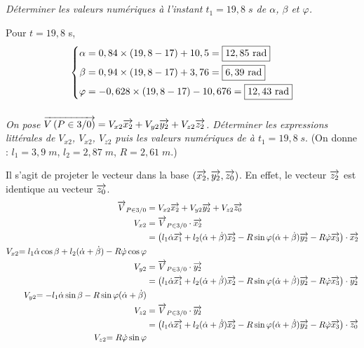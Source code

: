 \documentclass[10pt,fleqn]{article} %
\begin{document}
\begin{multicols}{2}
\subparagraph{}
\textit{Déterminer les valeurs numériques à l'instant $t_1=19,8\; s$ de $\alpha$, $\beta$ et $\varphi$.}
\ifprof
\begin{corrige}

Pour $t=19,8$ s,
\[
\left\{ \begin{aligned} 
\alpha&=0,84 \times (19,8-17) + 10,5=\boxed{12,85\text{ rad}}\\
\beta&=0,94\times (19,8-17) +3,76 = \boxed{6,39\text{ rad}}\\
\varphi &= -0,628\times (19,8-17) -10,676 =\boxed{12,43\text{ rad}}
 \end{aligned}\right.
\]

\end{corrige}\else\fi

\subparagraph{}
\textit{On pose $\overrightarrow{V\left( {P} \in {3}/{0}\right)}=V_{x2}\overrightarrow{x_2}+V_{y2}\overrightarrow{y_2}+V_{z2}\overrightarrow{z_2}$. Déterminer les expressions littérales de $V_{x2}$, $V_{x2}$, $V_{z2}$ puis les valeurs numériques de à $t_1=19,8\;s.$} (On donne : $l_1=3,9\;m$, $l_2=2,87\;m$, $R=2,61\;m$.)
\ifprof
\begin{corrige}

Il s'agit de projeter le vecteur  dans la base $(\overrightarrow{x_2}, \overrightarrow{y_2} ,\overrightarrow{z_0})$. En effet, le vecteur $\overrightarrow{z_2}$ est identique au vecteur $\overrightarrow{z_0}$.
\begin{align*}
\overrightarrow{V}_{P\in 3 / 0}&=V_{x2}\overrightarrow{x_2} +V_{y2}\overrightarrow{y_2} + V_{z2}\overrightarrow{z_0}\\
V_{x2}&=\overrightarrow{V}_{P\in 3 / 0}\cdot\overrightarrow{x_2}\\
	&=\left(l_1\dot\alpha\overrightarrow{x_{1}}+l_2(\dot\alpha+\dot\beta)\overrightarrow{x_2}-R\sin\varphi(\dot\alpha+\dot\beta)\overrightarrow{y_2}-R\dot\varphi\overrightarrow{x_3}\right)\cdot\overrightarrow{x_2}\\
{V_{x2}}{=l_1 \dot\alpha\cos\beta+l_2 (\dot\alpha+\dot\beta) -R \dot\varphi\cos\varphi}\\
V_{y2}&=\overrightarrow{V}_{P\in 3 / 0}\cdot\overrightarrow{y_2}\\
	&=\left(l_1\dot\alpha\overrightarrow{x_{1}}+l_2(\dot\alpha+\dot\beta)\overrightarrow{x_2}-R\sin\varphi(\dot\alpha+\dot\beta)\overrightarrow{y_2}-R\dot\varphi\overrightarrow{x_3}\right)\cdot\overrightarrow{y_2}\\
{V_{y2}}{=-l_1\dot\alpha\sin\beta-R\sin\varphi(\dot\alpha+\dot\beta)}\\
V_{z2}&=\overrightarrow{V}_{P\in 3 / 0}\cdot\overrightarrow{y_2}\\
	&=\left(l_1\dot\alpha\overrightarrow{x_{1}}+l_2(\dot\alpha+\dot\beta)\overrightarrow{x_2}-R\sin\varphi(\dot\alpha+\dot\beta)\overrightarrow{y_2}-R\dot\varphi\overrightarrow{x_3}\right)\cdot\overrightarrow{z_0}\\
{V_{z2}}{=R\dot\varphi\sin\varphi}
\end{align*}


\end{corrige}
\end{multicols}
\end{document}
